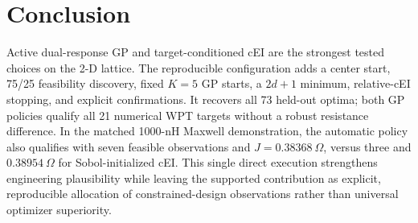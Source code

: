 \documentclass[conference]{IEEEtran}
\begin{document}
\section{Conclusion}
Active dual-response GP and target-conditioned cEI are the strongest tested choices on the 2-D lattice. The reproducible configuration adds a center start, 75/25 feasibility discovery, fixed $K=5$ GP starts, a $2d+1$ minimum, relative-cEI stopping, and explicit confirmations. It recovers all 73 held-out optima; both GP policies qualify all 21 numerical WPT targets without a robust resistance difference. In the matched 1000-nH Maxwell demonstration, the automatic policy also qualifies with seven feasible observations and $J=0.38368~\Omega$, versus three and $0.38954~\Omega$ for Sobol-initialized cEI. This single direct execution strengthens engineering plausibility while leaving the supported contribution as explicit, reproducible allocation of constrained-design observations rather than universal optimizer superiority.
\end{document}
